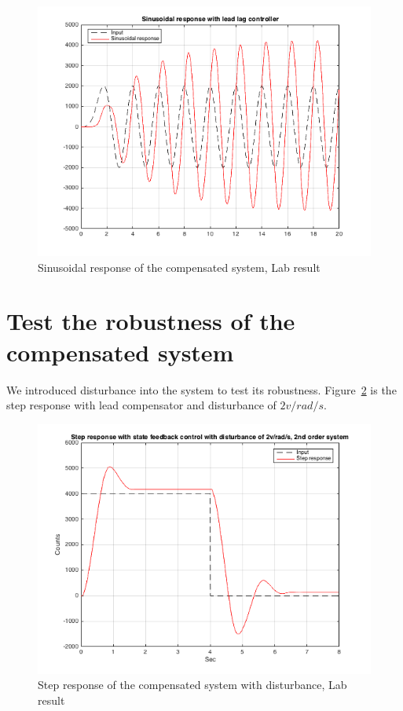 \documentclass[a4paper, 12pt]{article}
\begin{document}
\begin{figure}[!htbp]
\centering
\includegraphics[scale = 0.6]{LabSinusoidalResponseLeadLag}
\caption{Sinusoidal response of the compensated system, Lab result}
\label{LabSinusoidalResponseLeadLag}
\end{figure}


\section{Test the robustness of the compensated system}
\hspace{2.5ex}We introduced disturbance into the system to test its robustness. 
Figure~\ref{LabStepResponseLeadLagDisturbance} is the step response with lead compensator and disturbance of $2v /rad/s$.
\begin{figure}[!htbp]
\centering
\includegraphics[scale = 0.6]{LabStepResponseLeadLagDisturbance}
\caption{Step response of the compensated system with disturbance, Lab result}
\label{LabStepResponseLeadLagDisturbance}
\end{figure}
\end{document}
